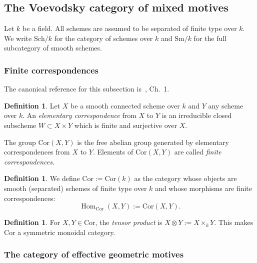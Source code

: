\documentclass[12pt,a4paper]{article}
\theoremstyle{definition}
\newtheorem{definition}[theorem]{Definition}
\newcommand{\Sm}{\mathrm{Sm}}
\newcommand{\Sch}{\mathrm{Sch}}
\newcommand{\Cor}{\mathrm{Cor}}
\newcommand{\Hom}{\operatorname{Hom}}
\begin{document}
\subsection{The Voevodsky category of mixed motives}

Let $k$ be a field.  All schemes are assumed to be separated of finite type over $k$.
We write $\Sch/k$ for the category of schemes over $k$ and $\Sm/k$ for the full
subcategory of smooth schemes.

\subsubsection{Finite correspondences}

The canonical reference for this subsection is~\cite{MVW06}, Ch.\ 1.

\begin{definition}\label{def:elementary-correspondence}
Let $X$ be a smooth connected scheme over $k$ and $Y$ any scheme over $k$.  An
\emph{elementary correspondence} from $X$ to $Y$ is an irreducible closed subscheme
$W\subset X\times Y$ which is finite and surjective over $X$.
\end{definition}

The group $\mathrm{Cor}(X,Y)$ is the free abelian group generated by elementary
correspondences from $X$ to $Y$.  Elements of $\mathrm{Cor}(X,Y)$ are called
\emph{finite correspondences}.

\begin{definition}\label{def:Cor}
We define $\Cor:=\Cor(k)$ as the category whose objects are smooth (separated) schemes
of finite type over $k$ and whose morphisms are finite correspondences:
\[
  \Hom_{\Cor}(X,Y) := \Cor(X,Y).
\]
\end{definition}

\begin{definition}\label{def:tensor-Cor}
For $X,Y\in\Cor$, the \emph{tensor product} is $X\otimes Y := X\times_k Y$.  This
makes $\Cor$ a symmetric monoidal category.
\end{definition}

\subsubsection{The category of effective geometric motives}
\end{document}
